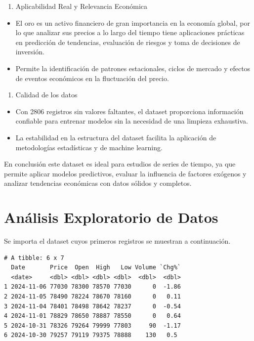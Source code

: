 \documentclass[
]{book}
\providecommand{\tightlist}{%
  \setlength{\itemsep}{0pt}\setlength{\parskip}{0pt}}
\begin{document}
\begin{enumerate}
\def\labelenumi{\arabic{enumi}.}
\setcounter{enumi}{3}
\tightlist
\item
  Aplicabilidad Real y Relevancia Económica
\end{enumerate}

\begin{itemize}
\tightlist
\item
  El oro es un activo financiero de gran importancia en la economía global, por lo que analizar sus precios a lo largo del tiempo tiene aplicaciones prácticas en predicción de tendencias, evaluación de riesgos y toma de decisiones de inversión.
\item
  Permite la identificación de patrones estacionales, ciclos de mercado y efectos de eventos económicos en la fluctuación del precio.
\end{itemize}

\begin{enumerate}
\def\labelenumi{\arabic{enumi}.}
\setcounter{enumi}{4}
\tightlist
\item
  Calidad de los datos
\end{enumerate}

\begin{itemize}
\tightlist
\item
  Con 2806 registros sin valores faltantes, el dataset proporciona información confiable para entrenar modelos sin la necesidad de una limpieza exhaustiva.
\item
  La estabilidad en la estructura del dataset facilita la aplicación de metodologías estadísticas y de machine learning.
\end{itemize}

En conclusión este dataset es ideal para estudios de series de tiempo, ya que permite aplicar modelos predictivos, evaluar la influencia de factores exógenos y analizar tendencias económicas con datos sólidos y completos.

\chapter{Análisis Exploratorio de Datos}\label{anuxe1lisis-exploratorio-de-datos}

Se importa el dataset cuyos primeros registros se muestran a continuación.

\begin{verbatim}
# A tibble: 6 x 7
  Date       Price  Open  High   Low Volume `Chg%`
  <date>     <dbl> <dbl> <dbl> <dbl>  <dbl>  <dbl>
1 2024-11-06 77030 78300 78570 77030      0  -1.86
2 2024-11-05 78490 78224 78670 78160      0   0.11
3 2024-11-04 78401 78498 78642 78237      0  -0.54
4 2024-11-01 78829 78650 78887 78550      0   0.64
5 2024-10-31 78326 79264 79999 77803     90  -1.17
6 2024-10-30 79257 79119 79375 78888    130   0.5 
\end{verbatim}
\end{document}
